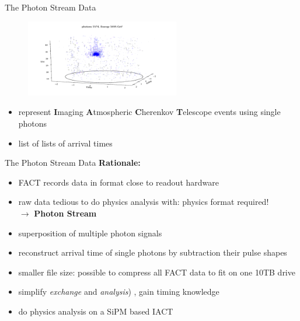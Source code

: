 \begin{frame}[t]{The Photon Stream Data}
  \begin{multicols}{2}
    \begin{figure}
        \centering
        \includegraphics[width=0.6\textwidth]{fig/event/example_event_small-15.png}
    \end{figure}
    \columnbreak
    \vspace*{\fill}
      \begin{itemize}
        \item represent \textbf{I}maging \textbf{A}tmospheric \textbf{C}herenkov \textbf{T}elescope events using single photons
        \item list of lists of arrival times
    \end{itemize}
    \vspace*{\fill}
  \end{multicols}
\end{frame}

\begin{frame}[t]{The Photon Stream Data}
    \large{\textbf{Rationale:}}
    \begin{itemize}
        \item FACT records data in format close to readout hardware
        \item raw data tedious to do physics analysis with: physics format required! \\ $\rightarrow$ \textbf{Photon Stream}
        \item superposition of multiple photon signals
        \item reconstruct arrival time of single photons by subtraction their pulse shapes 
        \item smaller file size: possible to compress all FACT data to fit on one 10TB drive 
        \item simplify \textit{exchange} and \textit{analysis}) , gain timing knowledge
        \item do physics analysis on a SiPM based IACT
    \end{itemize}
\end{frame}

